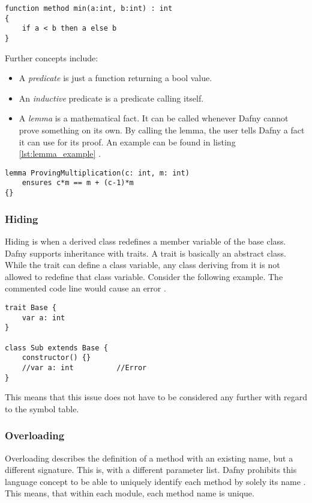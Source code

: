 \begin{lstlisting}[language=dafny, caption={Function Method Example}, captionpos=b, label={lst:function}]
function method min(a:int, b:int) : int
{
    if a < b then a else b
}
\end{lstlisting}

Further concepts include:
\begin{itemize}
\item A \textit{predicate} is just a function returning a bool value.
\item An \textit{inductive} predicate is a predicate calling itself.
\item A \textit{lemma} is a mathematical fact.
It can be called whenever Dafny cannot prove something on its own.
By calling the lemma, the user tells Dafny a fact it can use for its proof.
An example can be found in listing \ref{lst:lemma_example} \cite{dafnyReferenceManual}.
\end{itemize}

\begin{lstlisting}[language=dafny, caption={Lemma}, captionpos=b, label={lst:lemma_example}]
lemma ProvingMultiplication(c: int, m: int)
    ensures c*m == m + (c-1)*m
{}
\end{lstlisting}

\subsubsection{Hiding}
Hiding is when a derived class redefines a member variable of the base class.
Dafny supports inheritance with traits.
A trait is basically an abstract class.
While the trait can define a class variable, any class deriving from it is not allowed to redefine that class variable.
Consider the following example.
The commented code line would cause an error \cite{dafnyReferenceManual}.

\begin{lstlisting}[caption={Hiding}, captionpos=b, label={lst:hiding}]
trait Base {
    var a: int
}

class Sub extends Base {
    constructor() {}
    //var a: int          //Error
}
\end{lstlisting}

This means that this issue does not have to be considered any further with regard to the symbol table.

\subsubsection{Overloading}
Overloading describes the definition of a method with an existing name, but a different signature.
This is, with a different parameter list.
Dafny prohibits this language concept to be able to uniquely identify each method by solely its name \cite{dafnyReferenceManual}.
This means, that within each module, each method name is unique.

